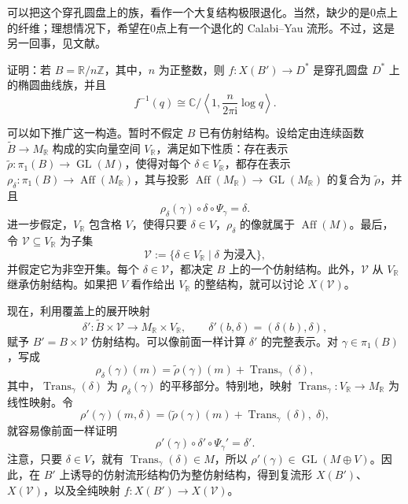 可以把这个穿孔圆盘上的族，看作一个大复结构极限退化。当然，缺少的是0点上的纤维；理想情况下，希望在0点上有一个退化的 Calabi--Yau 流形。不过，这是另一回事，见文献。

\begin{exercise}\label{exer:6.28}
证明：若 $B=\mathbb R/n\mathbb Z$，其中，$n$ 为正整数，则 $f\colon X(B')\to D^*$ 是穿孔圆盘 $D^*$ 上的椭圆曲线族，并且
\[
f^{-1}(q)\cong\mathbb C/\left\langle1,\frac{n}{2\pi\mathrm i}\log q\right\rangle.
\]
\end{exercise}

可以如下推广这一构造。暂时不假定 $B$ 已有仿射结构。设给定由连续函数 $\widetilde B\to M_{\mathbb R}$ 构成的实向量空间 $V_{\mathbb R}$，满足如下性质：存在表示 $\widetilde\rho\colon\pi_1(B)\to\operatorname{GL}(M)$，使得对每个 $\delta\in V_{\mathbb R}$，都存在表示 $\rho_\delta\colon\pi_1(B)\to\operatorname{Aff}(M_{\mathbb R})$，其与投影 $\operatorname{Aff}(M_{\mathbb R})\to\operatorname{GL}(M_{\mathbb R})$ 的复合为 $\widetilde\rho$，并且
\[
\rho_\delta(\gamma)\circ\delta\circ\Psi_\gamma=\delta.
\]
进一步假定，$V_{\mathbb R}$ 包含格 $V$，使得只要 $\delta\in V$，$\rho_\delta$ 的像就属于 $\operatorname{Aff}(M)$。最后，令 $\mathcal V\subseteq V_{\mathbb R}$ 为子集
\[
\mathcal V:=\{\delta\in V_{\mathbb R}\mid\delta\text{ 为浸入}\},
\]
并假定它为非空开集。每个 $\delta\in\mathcal V$，都决定 $B$ 上的一个仿射结构。此外，$\mathcal V$ 从 $V_{\mathbb R}$ 继承仿射结构。如果把 $V$ 看作给出 $V_{\mathbb R}$ 的整结构，就可以讨论 $X(\mathcal V)$。

现在，利用覆盖上的展开映射
\[
\delta'\colon\widetilde B\times\mathcal V
\longrightarrow M_{\mathbb R}\times V_{\mathbb R},
\qquad
\delta'(b,\delta)=(\delta(b),\delta),
\]
赋予 $B'=B\times\mathcal V$ 仿射结构。可以像前面一样计算 $\delta'$ 的完整表示。对 $\gamma\in\pi_1(B)$，写成
\[
\rho_\delta(\gamma)(m)
=\widetilde\rho(\gamma)(m)+\operatorname{Trans}_\gamma(\delta),
\]
其中，$\operatorname{Trans}_\gamma(\delta)$ 为 $\rho_\delta(\gamma)$ 的平移部分。特别地，映射 $\operatorname{Trans}_\gamma\colon V_{\mathbb R}\to M_{\mathbb R}$ 为线性映射。令
\[
\rho'(\gamma)(m,\delta)
=\bigl(\widetilde\rho(\gamma)(m)+\operatorname{Trans}_\gamma(\delta),\;\delta\bigr),
\]
就容易像前面一样证明
\[
\rho'(\gamma)\circ\delta'\circ\Psi_\gamma'=\delta'.
\]
注意，只要 $\delta\in V$，就有 $\operatorname{Trans}_\gamma(\delta)\in M$，所以 $\rho'(\gamma)\in\operatorname{GL}(M\oplus V)$。因此，在 $B'$ 上诱导的仿射流形结构仍为整仿射结构，得到复流形 $X(B')$、$X(\mathcal V)$，以及全纯映射 $f\colon X(B')\to X(\mathcal V)$。

